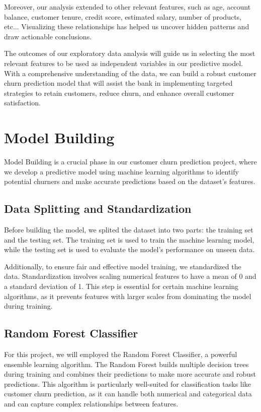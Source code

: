 \documentclass[11pt,a4paper]{article}
\begin{document}
Moreover, our analysis extended to other relevant features, such as age, account balance, customer tenure, credit score, estimated salary, number of products, etc... Visualizing these relationships has helped us uncover hidden patterns and draw actionable conclusions.

The outcomes of our exploratory data analysis will guide us in selecting the most relevant features to be used as independent variables in our predictive model. With a comprehensive understanding of the data, we can build a robust customer churn prediction model that will assist the bank in implementing targeted strategies to retain customers, reduce churn, and enhance overall customer satisfaction.

\section{Model Building}

Model Building is a crucial phase in our customer churn prediction project, where we develop a predictive model using machine learning algorithms to identify potential churners and make accurate predictions based on the dataset's features.

\subsection{Data Splitting and Standardization}

Before building the model, we splited the dataset into two parts: the training set and the testing set. The training set is used to train the machine learning model, while the testing set is used to evaluate the model's performance on unseen data.

Additionally, to ensure fair and effective model training, we standardized the data. Standardization involves scaling numerical features to have a mean of 0 and a standard deviation of 1. This step is essential for certain machine learning algorithms, as it prevents features with larger scales from dominating the model during training.

\subsection{Random Forest Classifier}

For this project, we will employed the Random Forest Classifier, a powerful ensemble learning algorithm. The Random Forest builds multiple decision trees during training and combines their predictions to make more accurate and robust predictions. This algorithm is particularly well-suited for classification tasks like customer churn prediction, as it can handle both numerical and categorical data and can capture complex relationships between features.
\end{document}
